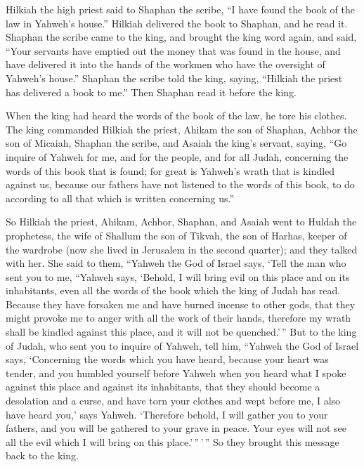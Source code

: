  Hilkiah the high priest said to Shaphan the scribe, ``I
have found the book of the law in Yahweh's house.'' Hilkiah delivered
the book to Shaphan, and he read it.  Shaphan the scribe
came to the king, and brought the king word again, and said, ``Your
servants have emptied out the money that was found in the house, and
have delivered it into the hands of the workmen who have the oversight
of Yahweh's house.''  Shaphan the scribe told the king,
saying, ``Hilkiah the priest has delivered a book to me.'' Then Shaphan
read it before the king.

 When the king had heard the words of the book of the
law, he tore his clothes.  The king commanded Hilkiah the
priest, Ahikam the son of Shaphan, Achbor the son of Micaiah, Shaphan
the scribe, and Asaiah the king's servant, saying,  ``Go
inquire of Yahweh for me, and for the people, and for all Judah,
concerning the words of this book that is found; for great is Yahweh's
wrath that is kindled against us, because our fathers have not listened
to the words of this book, to do according to all that which is written
concerning us.''

 So Hilkiah the priest, Ahikam, Achbor, Shaphan, and
Asaiah went to Huldah the prophetess, the wife of Shallum the son of
Tikvah, the son of Harhas, keeper of the wardrobe (now she lived in
Jerusalem in the second quarter); and they talked with her.
 She said to them, ``Yahweh the God of Israel says, `Tell
the man who sent you to me,  ``Yahweh says, `Behold, I
will bring evil on this place and on its inhabitants, even all the words
of the book which the king of Judah has read.  Because
they have forsaken me and have burned incense to other gods, that they
might provoke me to anger with all the work of their hands, therefore my
wrath shall be kindled against this place, and it will not be
quenched.'\,''  But to the king of Judah, who sent you to
inquire of Yahweh, tell him, ``Yahweh the God of Israel says,
`Concerning the words which you have heard,  because your
heart was tender, and you humbled yourself before Yahweh when you heard
what I spoke against this place and against its inhabitants, that they
should become a desolation and a curse, and have torn your clothes and
wept before me, I also have heard you,' says Yahweh. 
`Therefore behold, I will gather you to your fathers, and you will be
gathered to your grave in peace. Your eyes will not see all the evil
which I will bring on this place.'\,''\,'\,'' So they brought this
message back to the king.

